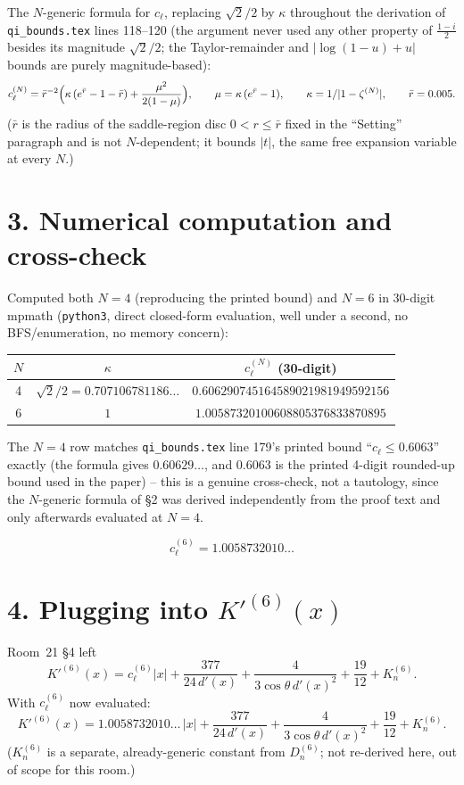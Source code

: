 \documentclass[11pt]{article}
\begin{document}
The $N$-generic formula for $c_\ell$, replacing $\sqrt2/2$ by $\kappa$ throughout the derivation
of \texttt{qi\_bounds.tex} lines 118--120 (the argument never used any other property of
$\frac{1-i}2$ besides its magnitude $\sqrt2/2$; the Taylor-remainder and $|\log(1-u)+u|$ bounds
are purely magnitude-based):
\[
  c_\ell^{(N)}=\bar r^{-2}\Bigl(\kappa\,(e^{\bar r}-1-\bar r)+\frac{\mu^2}{2(1-\mu)}\Bigr),
  \qquad \mu=\kappa\,(e^{\bar r}-1),\qquad \kappa=1/|1-\zeta^{(N)}|,\qquad \bar r=0.005.
\]
($\bar r$ is the radius of the saddle-region disc $0<r\le\bar r$ fixed in the ``Setting''
paragraph and is not $N$-dependent; it bounds $|t|$, the same free expansion variable at every
$N$.)

\section*{3. Numerical computation and cross-check}

Computed both $N=4$ (reproducing the printed bound) and $N=6$ in 30-digit mpmath
(\texttt{python3}, direct closed-form evaluation, well under a second, no BFS/enumeration, no
memory concern):
\begin{center}
\begin{tabular}{c|c|c}
$N$ & $\kappa$ & $c_\ell^{(N)}$ (30-digit) \\\hline
4 & $\sqrt2/2=0.707106781186\ldots$ & $0.606290745164589021981949592156$ \\
6 & $1$ & $\mathbf{1.00587320100608805376833870895}$
\end{tabular}
\end{center}
The $N=4$ row matches \texttt{qi\_bounds.tex} line 179's printed bound ``$c_\ell\le0.6063$''
exactly (the formula gives $0.60629\ldots$, and $0.6063$ is the printed 4-digit rounded-up
bound used in the paper) -- this is a genuine cross-check, not a tautology, since the $N$-generic
formula of \S2 was derived independently from the proof text and only afterwards evaluated at
$N=4$.

\[
  \boxed{c_\ell^{(6)}=1.0058732010\ldots}
\]

\section*{4. Plugging into $K'^{(6)}(x)$}

Room~21 \S4 left
\[
  K'^{(6)}(x)=c_\ell^{(6)}|x|+\frac{377}{24\,d'(x)}+\frac4{3\cos\theta\,d'(x)^2}+\frac{19}{12}+K_n^{(6)}.
\]
With $c_\ell^{(6)}$ now evaluated:
\[
  \boxed{K'^{(6)}(x)=1.0058732010\ldots\,|x|+\frac{377}{24\,d'(x)}+\frac4{3\cos\theta\,d'(x)^2}
  +\frac{19}{12}+K_n^{(6)}.}
\]
($K_n^{(6)}$ is a separate, already-generic constant from $D_n^{(6)}$; not re-derived here, out
of scope for this room.)
\end{document}
